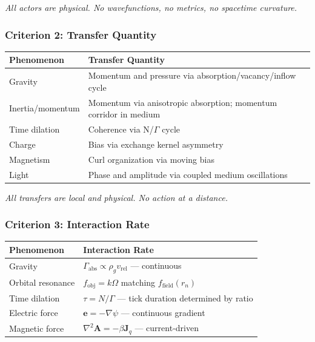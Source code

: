\documentclass[12pt, a4paper]{article}
\begin{document}
\textit{All actors are physical. No wavefunctions, no metrics, no spacetime curvature.}

\subsubsection{Criterion 2: Transfer Quantity}

\begin{center}
\begin{tabular}{|p{3.5cm}|p{10cm}|}
\hline
\textbf{Phenomenon} & \textbf{Transfer Quantity} \\
\hline
Gravity & Momentum and pressure via absorption/vacancy/inflow cycle \\
\hline
Inertia/momentum & Momentum via anisotropic absorption; momentum corridor in medium \\
\hline
Time dilation & Coherence via N/\(\Gamma\) cycle \\
\hline
Charge & Bias via exchange kernel asymmetry \\
\hline
Magnetism & Curl organization via moving bias \\
\hline
Light & Phase and amplitude via coupled medium oscillations \\
\hline
\end{tabular}
\end{center}

\textit{All transfers are local and physical. No action at a distance.}

\subsubsection{Criterion 3: Interaction Rate}

\begin{center}
\begin{tabular}{|p{3.5cm}|p{10cm}|}
\hline
\textbf{Phenomenon} & \textbf{Interaction Rate} \\
\hline
Gravity & \( \Gamma_{\text{abs}} \propto \rho_g v_{\text{rel}} \) — continuous \\
\hline
Orbital resonance & \( f_{\text{obj}} = k\Omega \) matching \( f_{\text{field}}(r_n) \) \\
\hline
Time dilation & \( \tau = N/\Gamma \) — tick duration determined by ratio \\
\hline
Electric force & \( \mathbf{e} = -\nabla \psi \) — continuous gradient \\
\hline
Magnetic force & \( \nabla^2 \mathbf{A} = -\beta \mathbf{J}_q \) — current-driven \\
\hline
\end{tabular}
\end{center}
\end{document}
